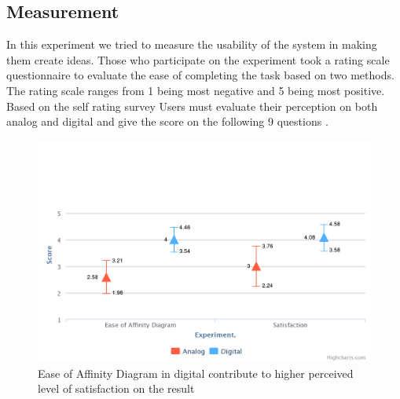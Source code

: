 \documentclass{sigchi}
\begin{document}
\begin{itemize}
\begin{itemize}
\section{Measurement}

In this experiment we tried to measure the usability of the system in making them create ideas. 
Those who participate on the experiment  took a rating scale questionnaire to evaluate the ease of completing the task based on two methods. The rating scale ranges  from 1 being most negative and 5 being most positive.  Based on the self rating survey Users must evaluate their perception on both analog and digital and give the score on the following 9 questions . 



\begin{figure}[!h]
\centering
\includegraphics[width=1.1\columnwidth]{affinity}
\caption{Ease of Affinity Diagram in digital contribute to higher perceived level of satisfaction on the result}
\label{fig:figure1}
\end{figure}




\end{itemize}
\end{itemize}
\end{document}
